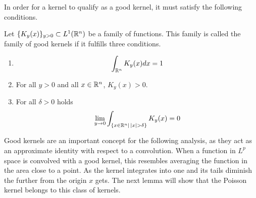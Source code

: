In order for a kernel to qualify as a good kernel, it must satisfy the following conditions.

\begin{definition}\label{def:goodkernel}
    Let $\{K_y(x)\}_{y>0}\subset L^1(\mathbb R^n)$ be a family of functions. This family is called the family of good kernels if it fulfills three conditions.
    \begin{enumerate}
        \item \begin{equation*}
            \int_{\mathbb R^n}K_y(x)dx =1
        \end{equation*}
        \item For all $y>0$ and all $x\in\mathbb R^n$, $K_y(x)>0$.
        \item For all $\delta>0$ holds
        \begin{equation*}
            \lim_{y\rightarrow0}\int_{\{x\in\RR^n|\,|x|>\delta\}}K_y(x)=0
        \end{equation*}
    \end{enumerate}
\end{definition}

Good kernels are an important concept for the following analysis, as they act as an approximate identity with respect to a convolution. When a function in $L^p$ space is convolved with a good kernel, this resembles averaging the function in the area close to a point. As the kernel integrates into one and its tails diminish the further from the origin $x$ gets. The next lemma will show that the Poisson kernel belongs to this class of kernels.

